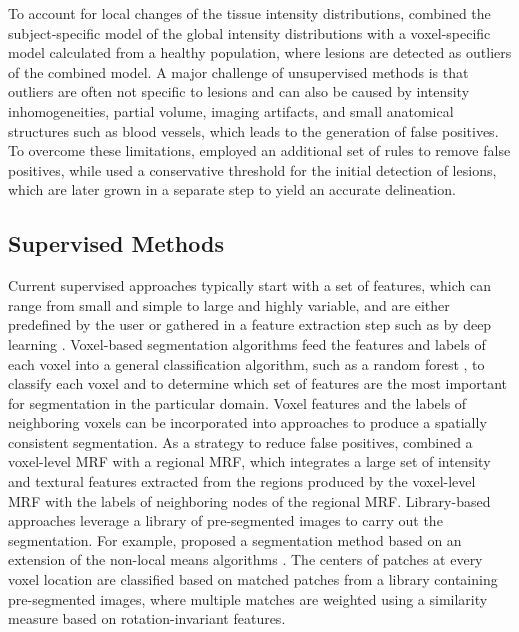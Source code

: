 To account for local changes of the tissue intensity distributions,
\citet{tomas2015} combined the subject-specific model of
the global intensity distributions with a voxel-specific model calculated from a
healthy population, where lesions are detected as outliers of the combined
model. A major challenge of unsupervised methods is that outliers are often not
specific to lesions and can also be caused by intensity inhomogeneities, partial
volume, imaging artifacts, and small anatomical structures such as blood
vessels, which leads to the generation of false positives. To overcome these
limitations, \citet{roura2015} employed an additional set of rules
to remove false positives, while \citet{schmidt2012automated} used
a conservative threshold for the initial detection of lesions, which are later
grown in a separate step to yield an accurate delineation.

\subsection[Supervised methods]{Supervised Methods}

Current supervised approaches typically start with a set of features, which can
range from small and simple to large and highly variable, and are either
predefined by the user \citep{geremia2010,guizard2015,subbanna2015} or gathered
in a feature extraction step such as by deep learning \citep{yoo2014}.
Voxel-based segmentation algorithms \citep{geremia2010,yoo2014} feed the
features and labels of each voxel into a general classification algorithm, such
as a random forest \citep{breiman2001}, to classify each voxel and to determine
which set of features are the most important for segmentation in the particular
domain. Voxel features and the labels of neighboring voxels can be incorporated
into  approaches
\citep{subbanna2009,subbanna2015} to produce a spatially consistent
segmentation. As a strategy to reduce false positives, \citet{subbanna2015}
combined a voxel-level MRF with a regional MRF, which integrates a large
set of intensity and textural features extracted from the regions produced by the
voxel-level MRF with the labels of neighboring nodes of the regional MRF.
Library-based approaches leverage a library of pre-segmented images to carry out
the segmentation. For example, \citet{guizard2015} proposed a segmentation
method based on an extension of the non-local means algorithms
\citep{coupe2011}. The centers of patches at every voxel location are classified
based on matched patches from a library containing pre-segmented images, where
multiple matches are weighted using a similarity measure based on
rotation-invariant features.

